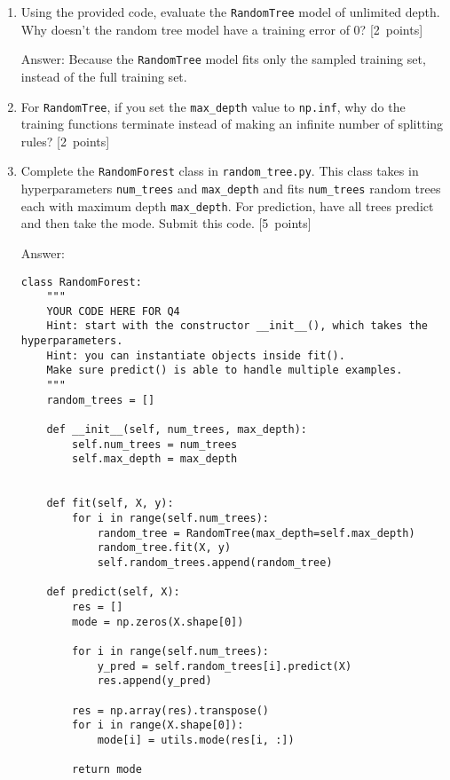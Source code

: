 \documentclass{article}
\newcommand{\blu}[1]{{\textcolor{blu}{#1}}}
\newcommand{\gre}[1]{\textcolor{gre}{#1}}
\newcommand\ans[1]{\par\gre{Answer: #1}}
\newenvironment{answer}{\par\begingroup\color{gre}Answer: }{\endgroup}
\let\ask\blu
\newcommand\pts[1]{\textcolor{pointscolour}{[#1~points]}}
\begin{document}
    \begin{enumerate}
        \item Using the provided code, evaluate the \texttt{RandomTree} model of unlimited depth. \ask{Why doesn't the random tree model have a training error of 0?} \pts{2}
        \ans{Because the \texttt{RandomTree} model fits only the sampled training set, instead of the full training set.}
        \item For \texttt{RandomTree}, if you set the \texttt{max\_depth} value to \texttt{np.inf}, \ask{why do the training functions terminate instead of making an infinite number of splitting rules?} \pts{2}
        \newpage
        \item Complete the \texttt{RandomForest} class in \texttt{random\string_tree.py}. This class takes in hyperparameters \texttt{num\string_trees} and \texttt{max\string_depth} and
        fits \texttt{num\string_trees} random trees each with maximum depth \texttt{max\string_depth}. For prediction, have all trees predict and then take the mode. \ask{Submit this code.} \pts{5}
        \begin{answer}
            \begin{verbatim}
class RandomForest:
    """
    YOUR CODE HERE FOR Q4
    Hint: start with the constructor __init__(), which takes the hyperparameters.
    Hint: you can instantiate objects inside fit().
    Make sure predict() is able to handle multiple examples.
    """
    random_trees = []

    def __init__(self, num_trees, max_depth):
        self.num_trees = num_trees
        self.max_depth = max_depth

    
    def fit(self, X, y):
        for i in range(self.num_trees):
            random_tree = RandomTree(max_depth=self.max_depth)
            random_tree.fit(X, y)
            self.random_trees.append(random_tree)
    
    def predict(self, X):
        res = []
        mode = np.zeros(X.shape[0])
        
        for i in range(self.num_trees):
            y_pred = self.random_trees[i].predict(X)
            res.append(y_pred)
        
        res = np.array(res).transpose()
        for i in range(X.shape[0]):
            mode[i] = utils.mode(res[i, :])

        return mode


\end{verbatim}
\end{answer}
\end{enumerate}
\end{document}
